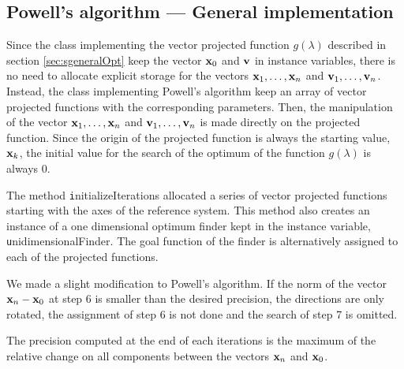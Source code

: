 \subsection{Powell's algorithm --- General implementation}
Since the class implementing the vector projected function
$g\left(\lambda\right)$ described in section
\ref{sec:sgeneralOpt} keep the vector
${\textbf x}_0$ and ${\textbf v}$ in instance variables, there is no need
to allocate explicit storage for the vectors ${\textbf
x}_1,\ldots,{\textbf x}_n$ and ${\textbf v}_1,\ldots,{\textbf v}_n$. Instead,
the class implementing Powell's algorithm keep an array of vector
projected functions with the corresponding parameters. Then, the
manipulation of the vector ${\textbf x}_1,\ldots,{\textbf x}_n$ and ${\textbf
v}_1,\ldots,{\textbf v}_n$ is made directly on the projected function.
Since the origin of the projected function is always the starting
value, ${\textbf x}_k$, the initial value for the search of the
optimum of the function $g\left(\lambda\right)$ is always 0.

The method {\texttt initializeIterations} allocated a series of vector
projected functions starting with the axes of the reference
system. This method also creates an instance of a one dimensional
optimum finder kept in the instance variable, {\texttt
unidimensionalFinder}. The goal function of the finder is
alternatively assigned to each of the projected functions.

We made a slight modification to Powell's algorithm. If the norm
of the vector ${\textbf x}_n-{\textbf x}_0$ at step 6 is smaller than the
desired precision, the directions are only rotated, the assignment
of step 6 is not done and the search of step 7 is omitted.

The precision computed  at the end of each iterations is the
maximum of the relative change on all components between the
vectors ${\textbf x}_n$ and ${\textbf x}_0$.


